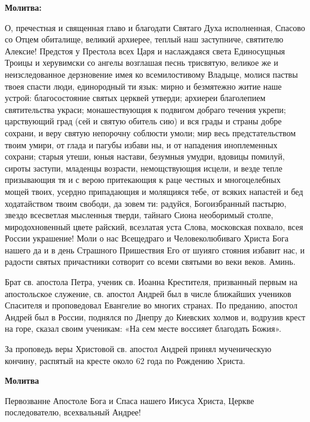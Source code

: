\medskip
\bfseries Молитва:\normalfont{}


О,  пречестная и священная  главо  и благодати Святаго Духа исполненная, Спасово со Отцем обиталище, великий архиерее, теплый наш заступниче, святителю Алексие! Предстоя у Престола всех Царя и наслаждаяся света Единосущныя Троицы и херувимски со ангелы возглашая песнь трисвятую, великое же и неизследованное дерзновение имея ко всемилостивому Владыце, молися паствы твоея спасти люди, единородный ти язык: мирно и безмятежно житие наше устрой: благосостояние святых церквей утверди; архиереи благолепием святительства украси; монашествующия к подвигом добраго течения укрепи; царствующий град (сей и святую обитель сию) и вся грады и страны добре сохрани, и веру святую непорочну соблюсти умоли; мир весь предстательством твоим умири, от глада и пагубы избави ны, и от нападения иноплеменных сохрани; старыя утеши, юныя настави, безумныя умудри, вдовицы помилуй, сироты заступи, младенцы возрасти, немощствующия исцели, и везде тепле призывающия тя и с верою притекающия к раце честных и многоцелебных мощей твоих, усердно припадающия и молящияся тебе, от всяких напастей и бед ходатайством твоим свободи, да зовем ти: радуйся, Богоизбранный пастырю, звездо всесветлая мысленныя тверди, тайнаго Сиона необоримый столпе, миродохновенный цвете райский, всезлатая уста Слова, московская похвало, всея России украшение! Моли о нас Всещедраго и Человеколюбиваго Христа Бога нашего да и в день Страшного Пришествия Его от шуияго стояния избавит нас, и радости святых причастники сотворит со всеми святыми во веки веков. Аминь.

\bigskip\bigskip\mychapterending

 
Брат св. апостола Петра, ученик св. Иоанна Крестителя, призванный первым на апостольское служение, св. апостол Андрей был в числе ближайших учеников Спасителя и проповедовал Евангелие во многих странах. По преданию, апостол Андрей был в России, поднялся по Днепру до Киевских холмов и, водрузив крест на горе, сказал своим ученикам: «На сем месте воссияет благодать Божия». 

За проповедь веры Христовой св. апостол Андрей принял мученическую кончину, распятый на кресте около 62 года по Рождению Xриста.


\medskip
\bfseries Молитва\normalfont{}

Первозванне Апостоле Бога и Спаса нашего Иисуса Христа, Церкве последователю, всехвальный Андрее! 


